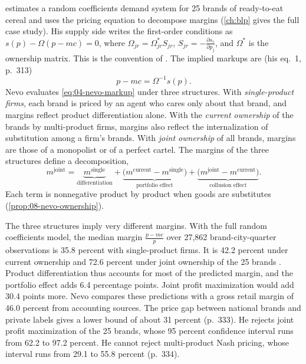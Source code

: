 \citet{Nevo2001} estimates a random coefficients demand system for 25 brands of ready-to-eat cereal and uses the
pricing equation to decompose margins (\cref{ch:blp} gives the full case study). His supply side writes the
first-order conditions as $s(p) - \Omega(p - mc) = 0$, where $\Omega_{jr} = \Omega^*_{jr}S_{jr}$, $S_{jr} =
-\frac{\partial s_r}{\partial p_j}$, and $\Omega^*$ is the ownership matrix. This is the convention of
\citet{BerryLevinsohnPakes1995}. The implied markups are (his eq.~1, p.~313)
\begin{equation}\label{eq:04-nevo-markup}
p - mc = \Omega^{-1}s(p) .
\end{equation}
Nevo evaluates \eqref{eq:04-nevo-markup} under three structures. With \emph{single-product firms}, each brand is
priced by an agent who cares only about that brand, and margins reflect product differentiation alone. With the
\emph{current ownership} of the brands by multi-product firms, margins also reflect the internalization of
substitution among a firm's brands. With \emph{joint ownership} of all brands, margins are those of a monopolist
or of a perfect cartel. The margins of the three structures define a decomposition,
\begin{equation}\label{eq:04-nevo-decomp}
m^{\mathrm{joint}} = \underbrace{m^{\mathrm{single}}}_{\text{differentiation}}
+ \underbrace{\big(m^{\mathrm{current}} - m^{\mathrm{single}}\big)}_{\text{portfolio effect}}
+ \underbrace{\big(m^{\mathrm{joint}} - m^{\mathrm{current}}\big)}_{\text{collusion effect}} .
\end{equation}
Each term is nonnegative product by product when goods are substitutes (\cref{prop:08-nevo-ownership}).

The three structures imply very different margins. With the full random coefficients model, the median margin $\frac{p - mc}{p}$ over
27,862 brand-city-quarter observations is 35.8 percent with single-product firms. It is 42.2 percent under current
ownership and 72.6 percent under joint ownership of the 25 brands \citep[Table~VIII]{Nevo2001}. Product
differentiation thus accounts for most of the predicted margin, and the portfolio effect adds 6.4 percentage
points. Joint profit maximization would add 30.4 points more. Nevo compares these predictions with a gross retail
margin of 46.0 percent from accounting sources. The price gap between national brands and private labels gives a
lower bound of about 31 percent (p.~333). He rejects joint profit maximization of the 25 brands, whose 95
percent confidence interval runs from 62.2 to 97.2 percent. He cannot reject multi-product Nash pricing, whose
interval runs from 29.1 to 55.8 percent (p.~334).

